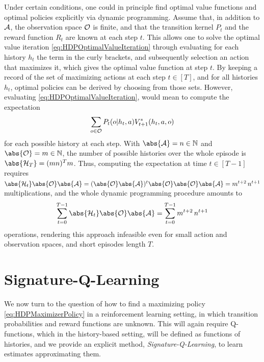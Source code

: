 \documentclass[
    a4paper,
    11pt,
    bibliography=totoc,
    listof=totoc,      
    headinclude=true,
    cleardoublepage=empty,
]{scrbook}
\theoremstyle{plain}
\theoremstyle{definition}
\theoremstyle{remark}
\newcommand{\SetN}{\mathbb N}
\newcommand{\SpaceA}{{\cal A}}
\newcommand{\SpaceO}{{\cal O}}
\newcommand{\SpaceH}{{\cal H}}
\begin{document}
Under certain conditions, one could in principle find optimal value
functions and optimal policies explicitly via dynamic programming. Assume 
that, in addition to $\SpaceA$, the observation space $\SpaceO$ is finite, and 
that the transition kernel $P_t$ and the reward function $R_t$ are known at 
each step $t$. This allows one to solve the optimal value iteration
\eqref{eq:HDPOptimalValueIteration} through evaluating for each history $h_t$ 
the term in the curly brackets, and subsequently selection an action that 
maximizes it, which gives the optimal value function at step $t$. By keeping a 
record of the set of maximizing actions at each step $t\in[T]$, and for all 
histories $h_t$, optimal policies can be derived by choosing from those sets. 
However, evaluating \eqref{eq:HDPOptimalValueIteration}, would mean to compute 
the expectation
\[
    \sum_{o\in\SpaceO} P_t(o|h_t,a) V^*_{t+1}(h_t,a,o)
\]
for each possible history at each step. With $\abs{\SpaceA}=n\in\SetN$ and 
$\abs{\SpaceO} = m\in\SetN$, the number of possible histories over the whole 
episode is $\abs{\SpaceH_T} = (mn)^Tm$. Thus, computing the expectation at time
$t\in[T-1]$ requires 
$
    \abs{\SpaceH_t}\abs{\SpaceO}\abs{\SpaceA} 
    = (\abs{\SpaceO}\abs{\SpaceA})^t \abs{\SpaceO}\abs{\SpaceO}\abs{\SpaceA} 
    = m^{t+2}\,n^{t+1}
$ multiplications, and the whole dynamic programming procedure amounts to 
\[
    \sum_{t=0}^{T-1} \abs{\SpaceH_t} \abs{\SpaceO} \abs{\SpaceA}
    = \sum_{t=0}^{T-1} m^{t+2}\,n^{t+1}
\]
operations, rendering this approach infeasible even for small action and
observation spaces, and short episodes length $T$.

 
\chapter{Signature-Q-Learning} 
\label{chapter:SignatureQLearning}

We now turn to the question of how to find a maximizing policy 
\eqref{eq:HDPMaximizerPolicy} in a reinforcement learning setting, in which 
transition probabilities and reward functions are unknown. This will again 
require Q-functions, which in the history-based setting, will be defined as 
functions of histories, and we provide an explicit method, 
\textit{Signature-Q-Learning}, to learn estimates approximating them.

\end{document}
